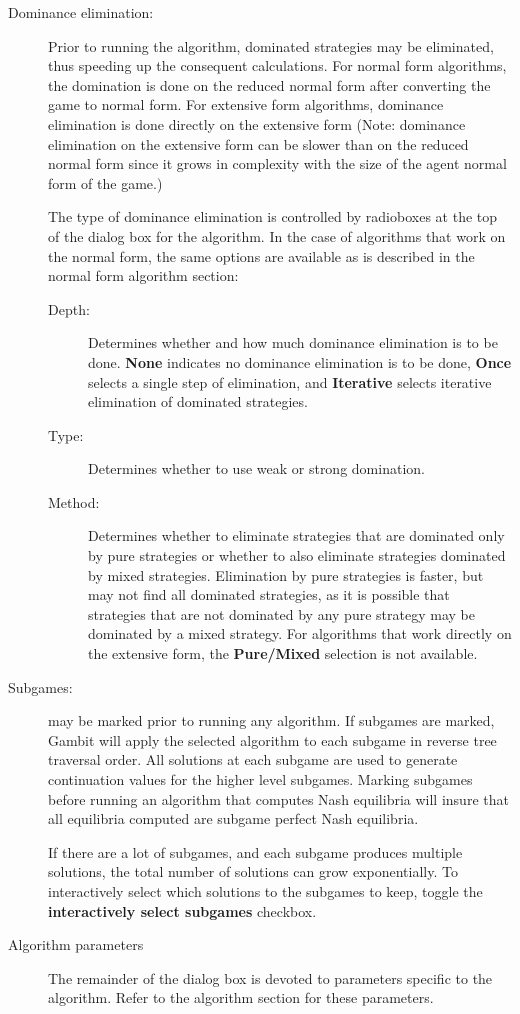 \documentclass[12pt]{report}
\begin{document}
\begin{description}
\item[Dominance elimination:] Prior to running the algorithm, dominated
strategies may be eliminated, thus speeding up the consequent
calculations.  For normal form algorithms, the domination is done on
the reduced normal form after converting the game to normal form.  For
extensive form algorithms, dominance elimination is done directly on
the extensive form (Note: dominance elimination on the extensive form
can be slower than on the reduced normal form since it grows in
complexity with the size of the agent normal form of the game.)

The type of dominance elimination is controlled by radioboxes at the
top of the dialog box for the algorithm.  In the case of algorithms
that work on the normal form, the same options are available as is
described in the normal form algorithm section:
\begin{description}
\item[Depth:] Determines whether and how much dominance elimination is
to be done.  {\bf None} indicates no dominance elimination is to be
done, {\bf Once} selects a single step of elimination, and {\bf 
Iterative} selects iterative elimination of dominated strategies.
\item[Type:] Determines whether to use weak or strong domination.
\item[Method:] Determines whether to eliminate strategies that are
dominated only by pure strategies or whether to also eliminate
strategies dominated by mixed strategies.  Elimination by pure
strategies is faster, but may not find all dominated strategies, as it
is possible that strategies that are not dominated by any pure
strategy may be dominated by a mixed strategy.  For algorithms that
work directly on the extensive form, the {\bf Pure/Mixed} selection is
not available.

\end{description}

\item[Subgames:]  may be marked prior
to running any algorithm.  If subgames are marked, Gambit will apply
the selected algorithm to each subgame in reverse tree traversal
order.  All solutions at each subgame are used to generate
continuation values for the higher level subgames.  Marking subgames
before running an algorithm that computes Nash equilibria will insure
that all equilibria computed are subgame perfect Nash equilibria.

If there are a lot of subgames, and each subgame produces multiple 
solutions, the total number of solutions can grow exponentially.  
To interactively select which solutions to the subgames to keep, toggle 
the {\bf interactively select subgames} checkbox.  

\item[Algorithm parameters] The remainder of the dialog box is devoted
to parameters specific to the algorithm. Refer to the algorithm
section for these parameters.

\end{description}
\end{document}

